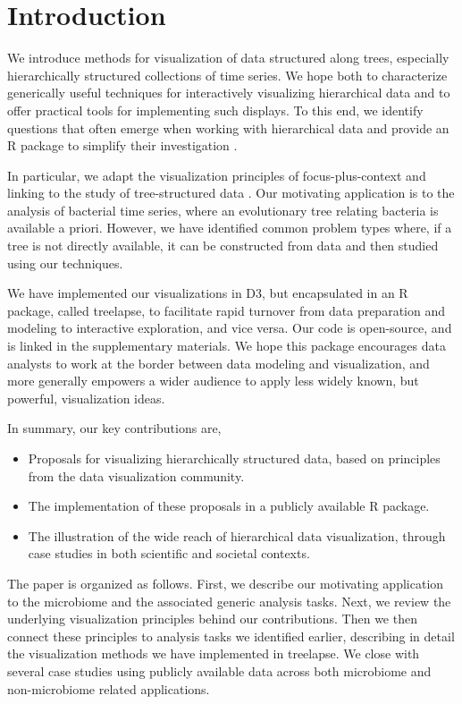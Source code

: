 \documentclass[12pt]{article}
\begin{document}
\newpage
{} %

\section{Introduction}\label{introduction}

We introduce methods for visualization of data structured along trees,
especially hierarchically structured collections of time series. We hope both to
characterize generically useful techniques for interactively visualizing
hierarchical data and to offer practical tools for implementing such displays.
To this end, we identify questions that often emerge when working with
hierarchical data and provide an R package to simplify their investigation
\citep{ihaka1996r}.

In particular, we adapt the visualization principles of focus-plus-context and
linking to the study of tree-structured data \citep{buja1996interactive,
  becker1987brushing}. Our motivating application is to the analysis of
bacterial time series, where an evolutionary tree relating bacteria is available
a priori. However, we have identified common problem types where, if a tree is
not directly available, it can be constructed from data and then studied using
our techniques.

We have implemented our visualizations in D3, but encapsulated in an R package,
called treelapse, to facilitate rapid turnover from data preparation and
modeling to interactive exploration, and vice versa. Our code is open-source,
and is linked in the supplementary materials. We hope this package encourages
data analysts to work at the border between data modeling and visualization, and
more generally empowers a wider audience to apply less widely known, but
powerful, visualization ideas.

In summary, our key contributions are,
\begin{itemize}
\item Proposals for visualizing hierarchically structured data, based on
  principles from the data visualization community.
\item The implementation of these proposals in a publicly available R package.
\item The illustration of the wide reach of hierarchical data visualization,
  through case studies in both scientific and societal contexts.
\end{itemize}

The paper is organized as follows. First, we describe our motivating application
to the microbiome and the associated generic analysis tasks. Next, we review the
underlying visualization principles behind our contributions. Then we then
connect these principles to analysis tasks we identified earlier, describing in
detail the visualization methods we have implemented in treelapse. We close with
several case studies using publicly available data across both microbiome and
non-microbiome related applications.
\end{document}
